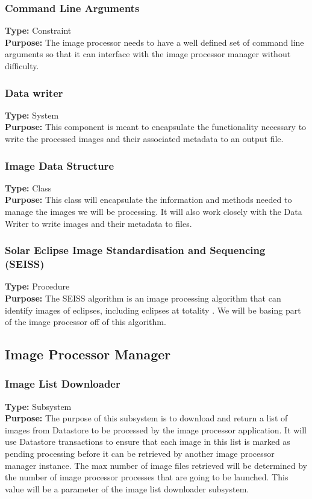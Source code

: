 \documentclass[10pt, onecolumn, draftclsnofoot, letterpaper, compsoc]{IEEEtran}
\begin{document}
\subsubsection{Command Line Arguments}
\textbf{Type:} Constraint\\
\textbf{Purpose:} The image processor needs to have a well defined set of
command line arguments so that it can interface with the image processor
manager without difficulty. \\

\subsubsection{Data writer}
\textbf{Type:} System\\
\textbf{Purpose:} This component is meant to encapsulate the functionality
necessary to write the processed images and their associated metadata to an
output file.\\

\subsubsection{Image Data Structure}
\textbf{Type:} Class\\
\textbf{Purpose:} This class will encapsulate the information and methods needed
to manage the images we will be processing. It will also work closely with the
Data Writer to write images and their metadata to files.\\

\subsubsection{Solar Eclipse Image Standardisation and Sequencing (SEISS)}
\textbf{Type:} Procedure\\
\textbf{Purpose:} The SEISS algorithm is an image processing algorithm that can
identify images of eclipses, including eclipses at totality \cite{imgKrista}. We
will be basing part of the image processor off of this algorithm. \\

\subsection{Image Processor Manager}

    \subsubsection{Image List Downloader}
    \textbf{Type:} Subsystem \\
    \textbf{Purpose:} The purpose of this subsystem is to download and return a list of images from Datastore 
    to be processed by the image processor application. It will use Datastore transactions to ensure that each 
    image in this list is marked as pending processing before it can be retrieved by another image processor 
    manager instance. The max number of image files retrieved will be determined by the number of image 
    processor processes that are going to be launched. This value will be a parameter of the image list 
    downloader subsystem. \\
\end{document}
